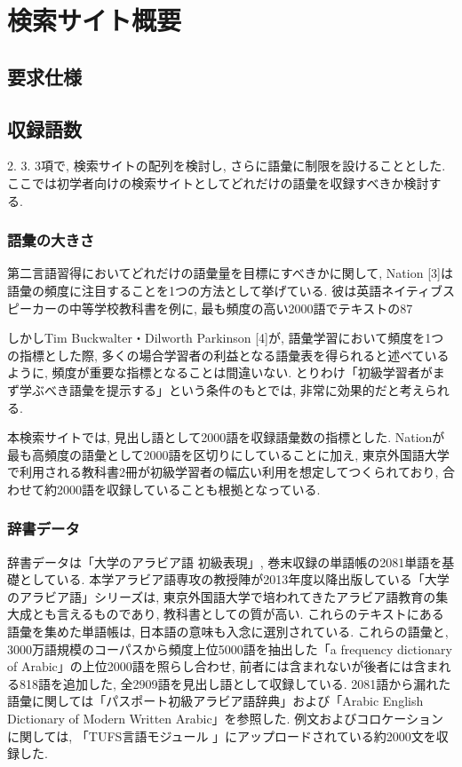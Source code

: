 \documentclass[technicalreport]{ieicej}
\begin{document}
\section{検索サイト概要}
\subsection{要求仕様}
\subsection{収録語数}
2. 3. 3項で, 検索サイトの配列を検討し, さらに語彙に制限を設けることとした. ここでは初学者向けの検索サイトとしてどれだけの語彙を収録すべきか検討する.

\subsubsection{語彙の大きさ}
第二言語習得においてどれだけの語彙量を目標にすべきかに関して, Nation [3]は語彙の頻度に注目することを1つの方法として挙げている. 彼は英語ネイティブスピーカーの中等学校教科書を例に, 最も頻度の高い2000語でテキストの87%

しかしTim Buckwalter・Dilworth Parkinson [4]が, 語彙学習において頻度を1つの指標とした際, 多くの場合学習者の利益となる語彙表を得られると述べているように, 頻度が重要な指標となることは間違いない. とりわけ「初級学習者がまず学ぶべき語彙を提示する」という条件のもとでは, 非常に効果的だと考えられる.

本検索サイトでは, 見出し語として2000語を収録語彙数の指標とした. Nationが最も高頻度の語彙として2000語を区切りにしていることに加え, 東京外国語大学で利用される教科書2冊が初級学習者の幅広い利用を想定してつくられており, 合わせて約2000語を収録していることも根拠となっている.

\subsubsection{辞書データ}
辞書データは「大学のアラビア語 初級表現」, 巻末収録の単語帳の2081単語を基礎としている. 本学アラビア語専攻の教授陣が2013年度以降出版している「大学のアラビア語」シリーズは, 東京外国語大学で培われてきたアラビア語教育の集大成とも言えるものであり, 教科書としての質が高い. これらのテキストにある語彙を集めた単語帳は, 日本語の意味も入念に選別されている. これらの語彙と, 3000万語規模のコーパスから頻度上位5000語を抽出した「a frequency dictionary of Arabic」の上位2000語を照らし合わせ, 前者には含まれないが後者には含まれる818語を追加した, 全2909語を見出し語として収録している. 2081語から漏れた語彙に関しては「パスポート初級アラビア語辞典」および「Arabic English Dictionary of Modern Written Arabic」を参照した. 例文およびコロケーションに関しては, 「TUFS言語モジュール 」にアップロードされている約2000文を収録した.
\end{document}
